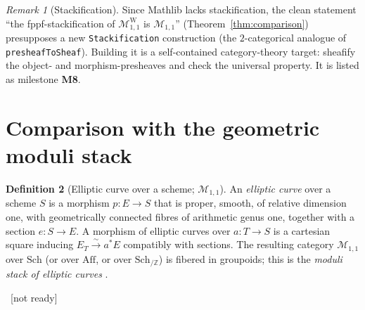 \documentclass[11pt]{article}
\newcommand{\lean}[1]{\par\smallskip\noindent{\footnotesize\texttt{Lean:\ #1}}\par}
\newcommand{\uses}[1]{}
\newcommand{\notready}{{\footnotesize\textcolor{red!60!black}{\ [not ready]}}}
\theoremstyle{definition}
\newtheorem{definition}{Definition}[section]
\theoremstyle{plain}
\theoremstyle{remark}
\newtheorem{remark}[definition]{Remark}
\newcommand{\Aff}{\mathrm{Aff}}
\newcommand{\Sch}{\mathrm{Sch}}
\newcommand{\MW}{\mathcal{M}^{\mathrm{W}}_{1,1}}
\newcommand{\Mss}{\mathcal{M}_{1,1}}
\begin{document}
\begin{remark}[Stackification]\label{rem:stackification}
Since Mathlib lacks stackification, the clean statement ``the fppf-stackification
of $\MW$ is $\Mss$'' (Theorem~\ref{thm:comparison}) presupposes a new
\texttt{Stackification} construction (the $2$-categorical analogue of
\texttt{presheafToSheaf}).  Building it is a self-contained category-theory
target: sheafify the object- and morphism-presheaves and check the universal
property.  It is listed as milestone \textbf{M8}.
\end{remark}

\section{Comparison with the geometric moduli stack}\label{sec:comparison}

\begin{definition}[Elliptic curve over a scheme; $\Mss$]\label{def:geomell}
An \emph{elliptic curve} over a scheme $S$ is a morphism $p:E\to S$ that is proper,
smooth, of relative dimension one, with geometrically connected fibres of
arithmetic genus one, together with a section $e:S\to E$.  A morphism of elliptic
curves over $a:T\to S$ is a cartesian square inducing $E_T\xrightarrow{\sim}
a^*E$ compatibly with sections.  The resulting category $\Mss$ over $\Sch$ (or
over $\Aff$, or over $\Sch_{/\mathbb Z}$) is fibered in groupoids; this is the
\emph{moduli stack of elliptic curves} \cite{DeligneRapoport,KatzMazur,Olsson}.
\lean{}\notready
\uses{def:cfg}
\end{definition}
\end{document}
